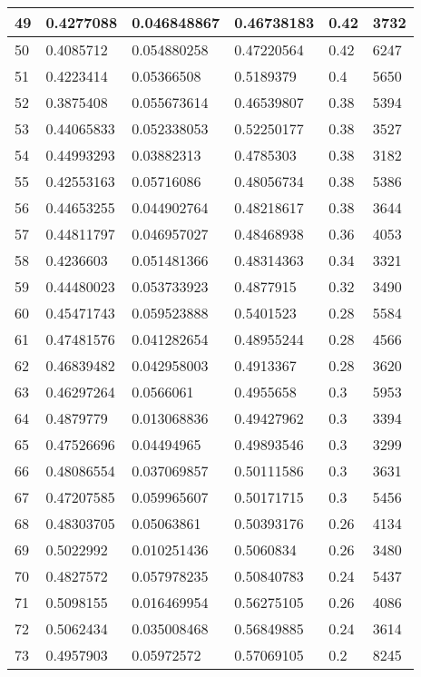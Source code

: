\begin{longtable}{|l|l|l|l|l|l|}
49 & 0.4277088 & 0.046848867 & 0.46738183 & 0.42 & 3732 \\ \hline 
50 & 0.4085712 & 0.054880258 & 0.47220564 & 0.42 & 6247 \\ \hline 
51 & 0.4223414 & 0.05366508 & 0.5189379 & 0.4 & 5650 \\ \hline 
52 & 0.3875408 & 0.055673614 & 0.46539807 & 0.38 & 5394 \\ \hline 
53 & 0.44065833 & 0.052338053 & 0.52250177 & 0.38 & 3527 \\ \hline 
54 & 0.44993293 & 0.03882313 & 0.4785303 & 0.38 & 3182 \\ \hline 
55 & 0.42553163 & 0.05716086 & 0.48056734 & 0.38 & 5386 \\ \hline 
56 & 0.44653255 & 0.044902764 & 0.48218617 & 0.38 & 3644 \\ \hline 
57 & 0.44811797 & 0.046957027 & 0.48468938 & 0.36 & 4053 \\ \hline 
58 & 0.4236603 & 0.051481366 & 0.48314363 & 0.34 & 3321 \\ \hline 
59 & 0.44480023 & 0.053733923 & 0.4877915 & 0.32 & 3490 \\ \hline 
60 & 0.45471743 & 0.059523888 & 0.5401523 & 0.28 & 5584 \\ \hline 
61 & 0.47481576 & 0.041282654 & 0.48955244 & 0.28 & 4566 \\ \hline 
62 & 0.46839482 & 0.042958003 & 0.4913367 & 0.28 & 3620 \\ \hline 
63 & 0.46297264 & 0.0566061 & 0.4955658 & 0.3 & 5953 \\ \hline 
64 & 0.4879779 & 0.013068836 & 0.49427962 & 0.3 & 3394 \\ \hline 
65 & 0.47526696 & 0.04494965 & 0.49893546 & 0.3 & 3299 \\ \hline 
66 & 0.48086554 & 0.037069857 & 0.50111586 & 0.3 & 3631 \\ \hline 
67 & 0.47207585 & 0.059965607 & 0.50171715 & 0.3 & 5456 \\ \hline 
68 & 0.48303705 & 0.05063861 & 0.50393176 & 0.26 & 4134 \\ \hline 
69 & 0.5022992 & 0.010251436 & 0.5060834 & 0.26 & 3480 \\ \hline 
70 & 0.4827572 & 0.057978235 & 0.50840783 & 0.24 & 5437 \\ \hline 
71 & 0.5098155 & 0.016469954 & 0.56275105 & 0.26 & 4086 \\ \hline 
72 & 0.5062434 & 0.035008468 & 0.56849885 & 0.24 & 3614 \\ \hline 
73 & 0.4957903 & 0.05972572 & 0.57069105 & 0.2 & 8245 \\ \hline 

\end{longtable}
